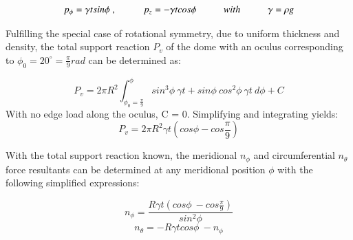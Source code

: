 \begin{equation} 
p_\phi = \gamma t sin\phi\ ,
\hspace{10mm}
p_z = -\gamma t cos\phi
\hspace{10mm}
with
\hspace{10mm}
\gamma = \rho g
\label{eqapp3_1}
\end{equation}

Fulfilling the special case of rotational symmetry, due to uniform thickness and density, the total support reaction $P_v$ of the dome with an oculus corresponding to $\phi_0 = 20^{\circ} = \frac{\pi}{9} rad$ can be determined as:

\begin{equation} 
P_v = 2\pi R^2 \int_{\phi_0 = \frac{\pi}{9}}^{\phi}
sin^3 \phi \ \gamma t + sin \phi \ cos^2 \phi \ \gamma t
\ d\phi + C
\label{eqapp3_2}
\end{equation}
With no edge load along the oculus, C = 0. Simplifying and integrating yields:
\begin{equation} 
P_v = 2\pi R^2 \gamma t (cos\phi - cos \frac{\pi}{9})
\label{eqapp3_3}
\end{equation}

With the total support reaction known, the meridional $n_\phi$ and circumferential $n_\theta$ force resultants can be determined at any meridional position $\phi$ with the following simplified expressions:

\begin{equation} 
n_\phi = \frac{R\gamma t (cos \phi \ - cos\frac{\pi}{9})}{sin^2\phi} 
\label{eqapp3_4}
\end{equation}
\begin{equation} 
n_\theta = -R \gamma t cos \phi \ - n_\phi
\label{eqapp3_5}
\end{equation}